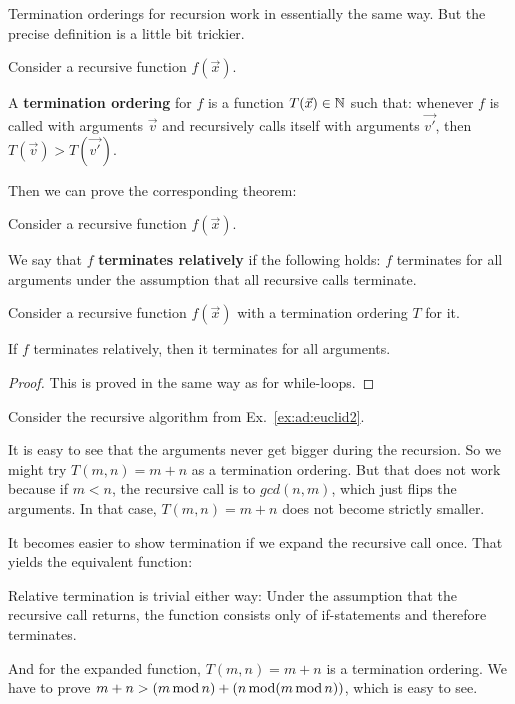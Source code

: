 Termination orderings for recursion work in essentially the same way.
But the precise definition is a little bit trickier.

\begin{definition}\label{sec:def:termord:rec}
Consider a recursive function $f(\vec{x})$.

A \textbf{termination ordering} for $f$ is a function $T(\vec{x})\in\mathbb{N}$ such that: whenever $f$ is called with arguments $\vec{v}$ and recursively calls itself with arguments $\vec{v'}$, then $T(\vec{v})>T(\vec{v'})$.
\end{definition}

Then we can prove the corresponding theorem:

\begin{definition}\label{sec:def:termord:relterm}
Consider a recursive function $f(\vec{x})$.

We say that $f$ \textbf{terminates relatively} if the following holds: $f$ terminates for all arguments under the assumption that all recursive calls terminate.
\end{definition}

\begin{theorem}\label{sec:thm:termord:rec}
Consider a recursive function $f(\vec{x})$ with a termination ordering $T$ for it.

If $f$ terminates relatively, then it terminates for all arguments.
\end{theorem}
\begin{proof}
This is proved in the same way as for while-loops.
\end{proof}

\begin{example}\label{ex:ad:euclid2:term}
Consider the recursive algorithm from Ex.~\ref{ex:ad:euclid2}.

It is easy to see that the arguments never get bigger during the recursion.
So we might try $T(m,n)=m+n$ as a termination ordering.
But that does not work because if $m<n$, the recursive call is to $gcd(n,m)$, which just flips the arguments.
In that case, $T(m,n)=m+n$ does not become strictly smaller.

It becomes easier to show termination if we expand the recursive call once.
That yields the equivalent function:
\begin{acode}
\end{acode}

Relative termination is trivial either way: Under the assumption that the recursive call returns, the function consists only of if-statements and therefore terminates.

And for the expanded function, $T(m,n)=m+n$ is a termination ordering.
We have to prove $m+n>(m\mathop{\mathrm{mod}} n)+(n\mathop{\mathrm{mod}}(m\mathop{\mathrm{mod}} n))$, which is easy to see.
\end{example}

